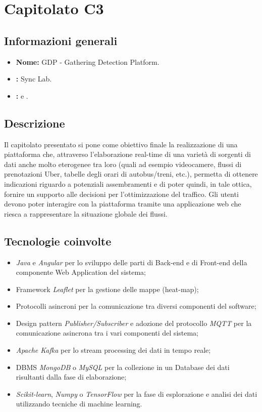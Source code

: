 \section{Capitolato C3}

\subsection{Informazioni generali}{
\begin{itemize}
\item \textbf{Nome:} GDP - Gathering Detection Platform.
\item \textbf{\commitProg:} Sync Lab.
\item \textbf{\proponProg:} \VT{} e \CR.
\end{itemize}
}

\subsection{Descrizione}{
Il capitolato presentato si pone come obiettivo finale la realizzazione di una piattaforma che, attraverso l'elaborazione real-time di una varietà di sorgenti di dati anche molto eterogenee tra loro (quali ad esempio videocamere, flussi di prenotazioni Uber, tabelle degli orari di autobus/treni, etc.), permetta di ottenere indicazioni riguardo a potenziali assembramenti e di poter quindi, in tale ottica, fornire un supporto alle decisioni per l'ottimizzazione del traffico.
Gli utenti devono poter interagire con la piattaforma tramite una applicazione web che riesca a rappresentare la situazione globale dei flussi.
}

\subsection{Tecnologie coinvolte}{
\begin{itemize}
\item \textit{Java} e \textit{Angular} per lo sviluppo delle parti di Back-end e di Front-end della componente Web Application del sistema; 
\item Framework \textit{Leaflet} per la gestione delle mappe (heat-map);
\item Protocolli asincroni per la comunicazione tra diversi componenti del software;
\item Design pattern \textit{Publisher/Subscriber} e adozione del protocollo \textit{MQTT} per la comunicazione asincrona tra i vari componenti del sistema;
\item \textit{Apache Kafka} per lo stream processing dei dati in tempo reale;
\item DBMS \textit{MongoDB} o \textit{MySQL}  per la collezione in un Database dei dati risultanti dalla fase di elaborazione;
\item \textit{Scikit-learn}, \textit{Numpy} o \textit{TensorFlow} per la fase di esplorazione e analisi dei dati utilizzando tecniche di machine learning.
\end{itemize}
}

